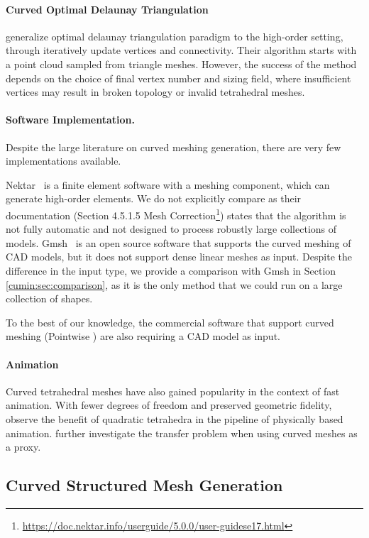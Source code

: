 \paragraph{Curved Optimal Delaunay Triangulation}
\cite{feng2018curved} generalize optimal delaunay triangulation paradigm to the high-order setting, through iteratively update vertices and connectivity.
Their algorithm starts with a point cloud sampled from triangle meshes. However, the success of the method depends on the choice of final vertex number and sizing field, where insufficient vertices may result in broken topology or invalid tetrahedral meshes.

\paragraph{Software Implementation.}
Despite the large literature on curve{d} meshing generation, there are very few implementations available. 

Nektar~\cite{moxeynekmesh} is a finite element software with a meshing component, which can generate high-order elements. We do not explicitly compare as their documentation (Section 4.5.1.5 Mesh Correction\footnote{\url{https://doc.nektar.info/userguide/5.0.0/user-guidese17.html}}) states that the algorithm is not fully automatic and not designed to process robustly large collections of models.
Gmsh~\cite{Geuzaine:2009:gmsh} is an open source software that supports the curved meshing of CAD models, but it does not support dense linear meshes as input. Despite the difference in the input type, we provide a comparison with Gmsh in Section \ref{cumin:sec:comparison}, as it is the only method that we could run on a large collection of shapes.

To the best of our knowledge, the commercial software that support curved meshing (Pointwise \cite{pointwise,Steve2016}) are also requiring a CAD model as input.

\paragraph{Animation}
Curved tetrahedral meshes have also gained popularity in the context of fast animation. With fewer degrees of freedom and preserved geometric fidelity, 
\cite{mezger2007finite} observe the benefit of quadratic tetrahedra in the pipeline of physically based animation.
\cite{Suwelack2013} further investigate the transfer problem when using curved meshes as a proxy.

\subsection{Curved Structured Mesh Generation}

